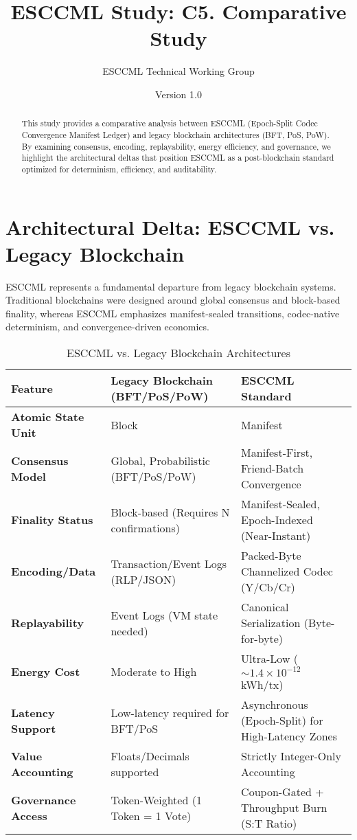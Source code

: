 \documentclass[11pt, a4paper]{article}
\title{\textbf{ESCCML Study: C5. Comparative Study}}
\author{ESCCML Technical Working Group}
\date{Version 1.0}
\begin{document}
\maketitle

\begin{abstract}
This study provides a comparative analysis between ESCCML (Epoch-Split Codec Convergence Manifest Ledger)
and legacy blockchain architectures (BFT, PoS, PoW). By examining consensus, encoding, replayability,
energy efficiency, and governance, we highlight the architectural deltas that position ESCCML as a
post-blockchain standard optimized for determinism, efficiency, and auditability.
\end{abstract}

\section{Architectural Delta: ESCCML vs. Legacy Blockchain}
ESCCML represents a fundamental departure from legacy blockchain systems. Traditional blockchains
were designed around global consensus and block-based finality, whereas ESCCML emphasizes
manifest-sealed transitions, codec-native determinism, and convergence-driven economics.

\begin{table}[ht]
    \centering
    \caption{ESCCML vs. Legacy Blockchain Architectures}
    \begin{tabular}{lll}
        \toprule
        \textbf{Feature} & \textbf{Legacy Blockchain (BFT/PoS/PoW)} & \textbf{ESCCML Standard} \\
        \midrule
        \textbf{Atomic State Unit} & Block & Manifest \\
        \textbf{Consensus Model} & Global, Probabilistic (BFT/PoS/PoW) & Manifest-First, Friend-Batch Convergence \\
        \textbf{Finality Status} & Block-based (Requires N confirmations) & Manifest-Sealed, Epoch-Indexed (Near-Instant) \\
        \textbf{Encoding/Data} & Transaction/Event Logs (RLP/JSON) & Packed-Byte Channelized Codec (Y/Cb/Cr) \\
        \textbf{Replayability} & Event Logs (VM state needed) & Canonical Serialization (Byte-for-byte) \\
        \textbf{Energy Cost} & Moderate to High & Ultra-Low ($\sim 1.4\times 10^{-12}$ kWh/tx) \\
        \textbf{Latency Support} & Low-latency required for BFT/PoS & Asynchronous (Epoch-Split) for High-Latency Zones \\
        \textbf{Value Accounting} & Floats/Decimals supported & Strictly Integer-Only Accounting \\
        \textbf{Governance Access} & Token-Weighted (1 Token = 1 Vote) & Coupon-Gated + Throughput Burn (S:T Ratio) \\
        \bottomrule
    \end{tabular}
\end{table}
\end{document}
